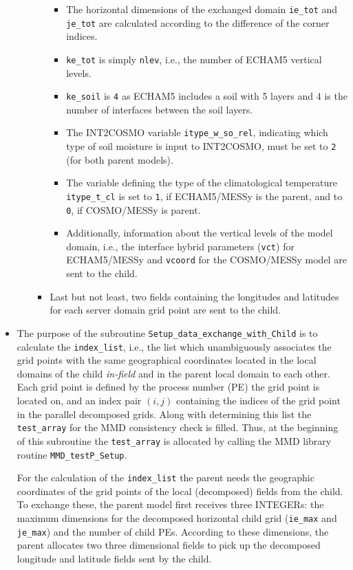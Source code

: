 \documentclass[11pt,twoside]{article}
\begin{document}
\begin{itemize}
\begin{itemize}
\begin{itemize}
\begin{itemize}
\item The horizontal dimensions of the exchanged domain \verb|ie_tot| and 
\verb|je_tot|
are calculated according to the difference of the corner indices. 
\item \verb|ke_tot|
is simply \verb|nlev|, i.e., the number of ECHAM5 vertical levels. 
\item  \verb|ke_soil| 
is \verb|4| as ECHAM5 includes a soil with 5 layers and 4 is the number of 
interfaces between the soil layers. 
\item The INT2COSMO variable \verb|itype_w_so_rel|, indicating which type of 
soil moisture is input to INT2COSMO, must be set to \verb|2| 
(for both parent models).
\item  The variable defining the type of the climatological temperature 
\verb|itype_t_cl| is set to \verb|1|, if ECHAM5/MESSy is the parent, and to
 \verb|0|, if  COSMO/MESSy is parent. 
\item Additionally, information about the vertical levels of the model domain,
 i.e., the interface hybrid parameters (\verb|vct|) for ECHAM5/MESSy and 
\verb|vcoord| for the COSMO/MESSy model are sent to the child.
\end{itemize}%
\item  Last but not 
least, two fields containing the longitudes and latitudes for each server domain
grid point are sent to the child.
\end{itemize} %
\end{itemize} %

\item The purpose of the
subroutine \verb|Setup_data_exchange_with_Child| \label{page:calindexlist} 
is to calculate the \verb|index_list|,  
i.e., the list which unambiguously associates the grid points
 with the same geographical coordinates located in the local domains of the 
child  {\it in-field} and in the parent local domain to each
other. Each grid 
point is defined by the process number (PE) the grid point is located on, and 
an index pair $(i,j)$ containing the indices of the grid point in the parallel 
decomposed grids.
Along with determining this list the \verb|test_array| for the MMD consistency 
check is filled. Thus, at the beginning of this subroutine the \verb|test_array|
 is allocated by calling the MMD library routine \verb|MMD_testP_Setup|.

For the calculation of the \verb|index_list| the parent needs the
geographic 
coordinates of the grid points of the local (decomposed) fields from the child.
To exchange these, the parent model first receives three {\footnotesize
INTEGERs}:  
the maximum dimensions for the decomposed horizontal child grid 
(\verb|ie_max| and \verb|je_max|) and the number of child PEs. 
According to these dimensions, the parent allocates two three 
dimensional fields to pick up the decomposed longitude and latitude fields sent
 by the child.


\end{itemize}
\end{document}
